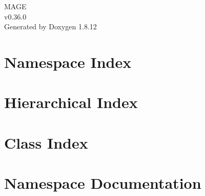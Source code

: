 \documentclass[twoside]{book}
\newcommand{\+}{\discretionary{\mbox{\scriptsize$\hookleftarrow$}}{}{}}
\newcommand{\clearemptydoublepage}{%
  \newpage{\pagestyle{empty}\cleardoublepage}%
}
\begin{document}
\hypersetup{pageanchor=false,
             bookmarksnumbered=true,
             pdfencoding=unicode
            }
\begin{titlepage}
\vspace*{7cm}
\begin{center}%
{\Large M\+A\+GE \\[1ex]\large v0.\+36.\+0 }\\
\vspace*{1cm}
{\large Generated by Doxygen 1.8.12}\\
\end{center}
\end{titlepage}
\clearemptydoublepage
{}
\tableofcontents
\clearemptydoublepage
{}
\hypersetup{pageanchor=true}

\chapter{Namespace Index}

\chapter{Hierarchical Index}

\chapter{Class Index}

\chapter{Namespace Documentation}

\end{document}
